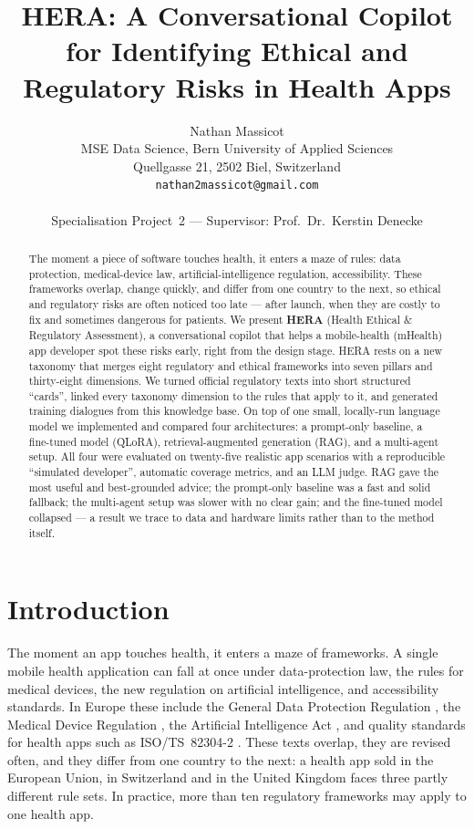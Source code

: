 \documentclass[11pt]{article}
\title{HERA: A Conversational Copilot for Identifying Ethical and\\
       Regulatory Risks in Health Apps}
\author{Nathan Massicot \\
        MSE Data Science, Bern University of Applied Sciences \\
        Quellgasse 21, 2502 Biel, Switzerland \\
        \texttt{nathan2massicot@gmail.com} \\
        \\
        \small Specialisation Project~2 --- Supervisor: Prof.\ Dr.\ Kerstin Denecke}
\begin{document}
\maketitle

\begin{abstract}
The moment a piece of software touches health, it enters a maze of rules: data
protection, medical-device law, artificial-intelligence regulation, accessibility.
These frameworks overlap, change quickly, and differ from one country to the next,
so ethical and regulatory risks are often noticed too late --- after launch, when they
are costly to fix and sometimes dangerous for patients. We present \textbf{HERA}
(Health Ethical \& Regulatory Assessment), a conversational copilot that helps a
mobile-health (mHealth) app developer spot these risks early, right from the design
stage. HERA rests on a new taxonomy that merges eight regulatory and ethical
frameworks into seven pillars and thirty-eight dimensions. We turned official
regulatory texts into short structured ``cards'', linked every taxonomy dimension to
the rules that apply to it, and generated training dialogues from this knowledge base.
On top of one small, locally-run language model we implemented and compared four
architectures: a prompt-only baseline, a fine-tuned model (QLoRA), retrieval-augmented
generation (RAG), and a multi-agent setup. All four were evaluated on twenty-five
realistic app scenarios with a reproducible ``simulated developer'', automatic
coverage metrics, and an LLM judge. RAG gave the most useful and best-grounded advice;
the prompt-only baseline was a fast and solid fallback; the multi-agent setup was
slower with no clear gain; and the fine-tuned model collapsed --- a result we trace to
data and hardware limits rather than to the method itself.
\end{abstract}

\section{Introduction}

The moment an app touches health, it enters a maze of frameworks. A single mobile
health application can fall at once under data-protection law, the rules for medical
devices, the new regulation on artificial intelligence, and accessibility standards.
In Europe these include the General Data Protection Regulation \citep{gdpr2016}, the
Medical Device Regulation \citep{mdr2017}, the Artificial Intelligence Act
\citep{euaiact2024}, and quality standards for health apps such as ISO/TS~82304-2
\citep{iso82304}. These texts overlap, they are revised often, and they differ from one
country to the next: a health app sold in the European Union, in Switzerland and in the
United Kingdom faces three partly different rule sets. In practice, more than ten
regulatory frameworks may apply to one health app.
\end{document}
